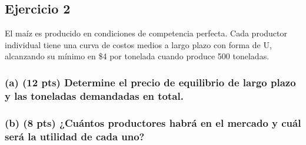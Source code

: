 \documentclass[12pt,letterpaper]{article}
\begin{document}
\subsection*{Ejercicio 2}

El maíz es producido en condiciones de competencia perfecta. Cada productor individual tiene una curva de costos medios a largo plazo con forma de U, alcanzando su mínimo en \$4 por tonelada cuando produce 500 toneladas.

\subsubsection*{(a) (12 pts) Determine el precio de equilibrio de largo plazo y las toneladas demandadas en total.}



\subsubsection*{(b) (8 pts) ¿Cuántos productores habrá en el mercado y cuál será la utilidad de cada uno?}
\end{document}
